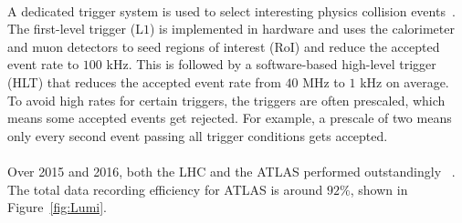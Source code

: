 \paragraph{}
A dedicated trigger system is used to select interesting physics collision events~\cite{ATLAS-TRIGGER}.
The first-level trigger (L$1$) is implemented in hardware and uses the calorimeter and muon detectors to seed regions of interest (RoI) and reduce the accepted event rate to $100$ kHz.
This is followed by a software-based high-level trigger (HLT) that reduces the accepted event rate from $40$ MHz to $1$ kHz on average. 
To avoid high rates for certain triggers, the triggers are often prescaled, which means some accepted events get rejected. 
For example, a prescale of two means only every second event passing all trigger conditions gets accepted. 


\paragraph{}
Over 2015 and 2016, both the LHC and the ATLAS performed outstandingly ~\cite{Lumi_Run2}. The total data recording efficiency for ATLAS is around $92\%$, shown in Figure~\ref{fig:Lumi}.







